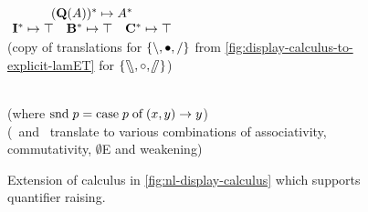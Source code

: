 \begin{figure}[h]
\begin{mdframed}
\begin{pfbox}
    \end{pfbox}
    \\[1\baselineskip]
    \hrulefill
    \\[1\baselineskip]
    {
      \renewcommand{\arraystretch}{1.5}%
      \(\!
      \begin{array}{c c c}
        \multicolumn{3}{c}{\tr[({\q[A]})]\mapsto\tr[A]}\\
        \tr[\I]\mapsto\top      & \tr [\B]\mapsto\top     & \tr [\C]\mapsto\top\\
      \end{array}
      \)
    }
    \\[1\baselineskip]
    (copy of translations for $\{\mathbin{\backslash},\bullet,\mathbin{\slash}\}$ from
    \autoref{fig:display-calculus-to-explicit-lamET} for
    $\{\fatbslash,\mathbin{\circ},\!\!\fatslash\:\}$)
    \\[1\baselineskip]
    \begin{pfbox}
    \end{pfbox}
    \begin{pfbox}
    \end{pfbox}
    \begin{pfbox}
      \RightLabel{$\I^-$}
    \end{pfbox}
    \\[1\baselineskip]
    (where $\text{snd}\;p=\text{case}\;p\;\text{of}\;(x, y)\rightarrow y$)
    \\[1\baselineskip]
    (\B\ and \C\ translate to various combinations of associativity,
    commutativity, $\emptyset$E and weakening)
    \\
    \vspace*{\baselineskip}
  \end{mdframed}
  \caption{
    Extension of calculus in \autoref{fig:nl-display-calculus} which
    supports quantifier raising.}%
  \label{fig:extension-quantifier-raising}
\end{figure}
